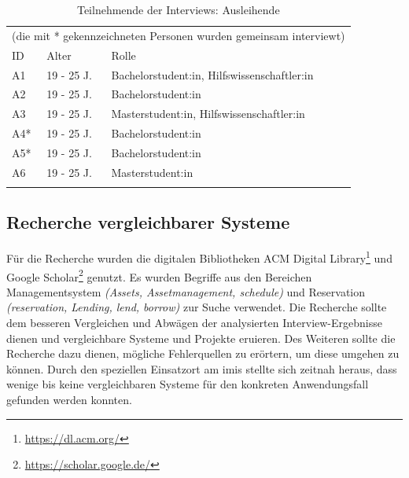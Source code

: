 \begin{table}[h]
        \centering
        \caption{Teilnehmende der Interviews: Ausleihende }
        \begin{tabular}{lll}
                \multicolumn{3}{c}{(die mit * gekennzeichneten Personen wurden gemeinsam
                interviewt) } \\
                \arrayrulecolor{maincolor}\hline
                \sffamily\color{maincolor}ID & \sffamily\color{maincolor}Alter &
                \sffamily\color{maincolor}Rolle
                \\
                \arrayrulecolor{maincolor}\hline
                A1                           & 19 - 25 J.                      &
                Bachelorstudent:in, Hilfswissenschaftler:in
                \\
                A2                           & 19 - 25 J.                      &
                Bachelorstudent:in                                                  \\
                A3                           & 19 - 25 J.                      &
                Masterstudent:in, Hilfswissenschaftler:in
                \\
                A4*                          & 19 - 25 J.                      &
                Bachelorstudent:in                                                \\
                A5*                          & 19 - 25 J.                      &
                Bachelorstudent:in                                                \\
                A6                           & 19 - 25 J.                      &
                Masterstudent:in                                                  \\
                \arrayrulecolor{maincolor}\hline
        \end{tabular}
        \label{table:a}
\end{table}

\subsection{Recherche vergleichbarer Systeme}
\label{subsection:system}
Für die Recherche wurden die digitalen Bibliotheken ACM Digital
Library\footnote{\url{https://dl.acm.org/}} und Google
Scholar\footnote{\url{https://scholar.google.de/}} genutzt. Es wurden Begriffe
aus den Bereichen Managementsystem \textit{(Assets, Assetmanagement, schedule)}
und Reservation \textit{(reservation, Lending, lend, borrow)} zur Suche
verwendet. Die Recherche sollte dem besseren Vergleichen und Abwägen der
analysierten Interview-Ergebnisse dienen und vergleichbare Systeme und Projekte
eruieren. Des Weiteren sollte die Recherche dazu dienen, mögliche Fehlerquellen
zu erörtern, um diese umgehen zu können. Durch den speziellen Einsatzort am
\ac{imis} stellte sich zeitnah heraus, dass wenige bis keine vergleichbaren
Systeme für den konkreten Anwendungsfall gefunden werden konnten.

